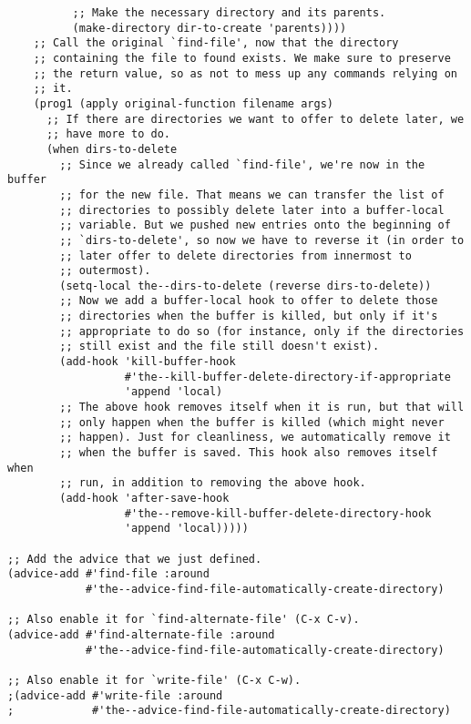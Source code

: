 \documentclass[11pt]{article}
\begin{document}
\begin{enumerate}
\begin{verbatim}
          ;; Make the necessary directory and its parents.
          (make-directory dir-to-create 'parents))))
    ;; Call the original `find-file', now that the directory
    ;; containing the file to found exists. We make sure to preserve
    ;; the return value, so as not to mess up any commands relying on
    ;; it.
    (prog1 (apply original-function filename args)
      ;; If there are directories we want to offer to delete later, we
      ;; have more to do.
      (when dirs-to-delete
        ;; Since we already called `find-file', we're now in the buffer
        ;; for the new file. That means we can transfer the list of
        ;; directories to possibly delete later into a buffer-local
        ;; variable. But we pushed new entries onto the beginning of
        ;; `dirs-to-delete', so now we have to reverse it (in order to
        ;; later offer to delete directories from innermost to
        ;; outermost).
        (setq-local the--dirs-to-delete (reverse dirs-to-delete))
        ;; Now we add a buffer-local hook to offer to delete those
        ;; directories when the buffer is killed, but only if it's
        ;; appropriate to do so (for instance, only if the directories
        ;; still exist and the file still doesn't exist).
        (add-hook 'kill-buffer-hook
                  #'the--kill-buffer-delete-directory-if-appropriate
                  'append 'local)
        ;; The above hook removes itself when it is run, but that will
        ;; only happen when the buffer is killed (which might never
        ;; happen). Just for cleanliness, we automatically remove it
        ;; when the buffer is saved. This hook also removes itself when
        ;; run, in addition to removing the above hook.
        (add-hook 'after-save-hook
                  #'the--remove-kill-buffer-delete-directory-hook
                  'append 'local)))))

;; Add the advice that we just defined.
(advice-add #'find-file :around
            #'the--advice-find-file-automatically-create-directory)

;; Also enable it for `find-alternate-file' (C-x C-v).
(advice-add #'find-alternate-file :around
            #'the--advice-find-file-automatically-create-directory)

;; Also enable it for `write-file' (C-x C-w).
;(advice-add #'write-file :around
;            #'the--advice-find-file-automatically-create-directory)


\end{verbatim}
\end{enumerate}
\end{document}
